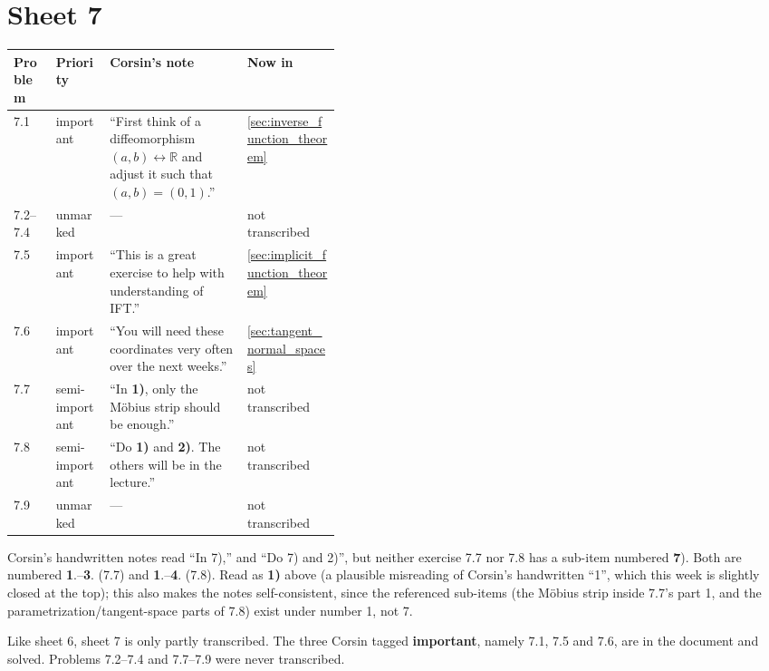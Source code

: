 \section{Sheet 7}
\label{sec:sheet_index_7}

\begin{center}
\begin{tabular}{@{}l l p{0.42\linewidth} l@{}}
\textbf{Problem} & \textbf{Priority} & \textbf{Corsin's note} & \textbf{Now in} \\
\hline
7.1 & important & ``First think of a diffeomorphism $(a,b) \leftrightarrow \mathbb{R}$ and
  adjust it such that $(a,b)=(0,1)$.'' & \cref{sec:inverse_function_theorem} \\[3pt]
7.2--7.4 & unmarked & --- & not transcribed \\[3pt]
7.5 & important & ``This is a great exercise to help with understanding of IFT.'' &
  \cref{sec:implicit_function_theorem} \\[3pt]
7.6 & important & ``You will need these coordinates very often over the next weeks.'' &
  \cref{sec:tangent_normal_spaces} \\[3pt]
7.7 & semi-important & ``In \textbf{1)}, only the M\"obius strip should be enough.'' &
  not transcribed \\[3pt]
7.8 & semi-important & ``Do \textbf{1)} and \textbf{2)}. The others will be in the lecture.'' &
  not transcribed \\[3pt]
7.9 & unmarked & --- & not transcribed \\
\end{tabular}
\end{center}

\begin{ainote}
Corsin's handwritten notes read ``In 7),'' and ``Do 7) and 2)'', but neither exercise 7.7 nor 7.8
has a sub-item numbered \textbf{7}). Both are numbered \textbf{1}.--\textbf{3}. (7.7) and
\textbf{1}.--\textbf{4}. (7.8). Read as \textbf{1)} above (a plausible misreading of Corsin's
handwritten ``1'', which this week is slightly closed at the top); this also makes the notes
self-consistent, since the referenced sub-items (the M\"obius strip inside 7.7's part 1, and the
parametrization/tangent-space parts of 7.8) exist under number 1, not 7.
\end{ainote}

\begin{ainote}
Like sheet 6, sheet 7 is only partly transcribed. The three Corsin tagged \textbf{important},
namely 7.1, 7.5 and 7.6, are in the document and solved. Problems 7.2--7.4 and 7.7--7.9 were
never transcribed.
\end{ainote}

